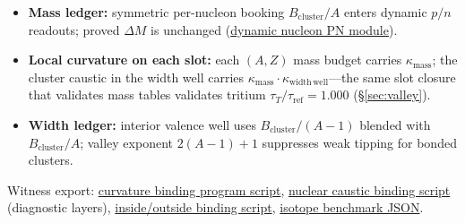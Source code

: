 \documentclass[11pt,notitlepage]{amsart}
\begin{document}
\begin{itemize}[leftmargin=2em]
\item \textbf{Mass ledger:} symmetric per-nucleon booking $B_{\mathrm{cluster}}/A$
  enters dynamic $p/n$ readouts; proved $\Delta M$ is unchanged
  (\hyperref[lean:dynamic-pn]{dynamic nucleon PN module}).
\item \textbf{Local curvature on each slot:} each $(A,Z)$ mass budget carries
  $\kappa_{\mathrm{mass}}$; the cluster caustic in the width well carries
  $\kappa_{\mathrm{mass}}\cdot\kappa_{\mathrm{width\,well}}$---the same slot closure
  that validates mass tables validates tritium $\tau_T/\tau_{\mathrm{ref}}=1.000$
  (\S\ref{sec:valley}).
\item \textbf{Width ledger:} interior valence well uses $B_{\mathrm{cluster}}/(A-1)$
  blended with $B_{\mathrm{cluster}}/A$; valley exponent $2(A-1)+1$ suppresses weak
  tipping for bonded clusters.
\end{itemize}

Witness export: \hyperref[script:curvature-binding]{curvature binding program script},
\hyperref[script:nuclear-caustic]{nuclear caustic binding script} (diagnostic layers),
\hyperref[script:inside-outside]{inside/outside binding script},
\hyperref[app:scripts]{isotope benchmark JSON}.
\end{document}
